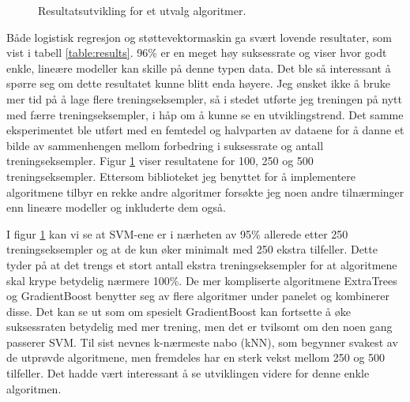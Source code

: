 \begin{figure}[h!]
\centering
{}
\label{figure:resultsgraf}
\caption{Resultatsutvikling for et utvalg algoritmer.}
\end{figure}

Både logistisk regresjon og støttevektormaskin ga svært lovende resultater, som vist i tabell \ref{table:results}. 96\% er en meget høy suksessrate og viser hvor godt enkle, lineære modeller kan skille på denne typen data. Det ble så interessant å spørre seg om dette resultatet kunne blitt enda høyere. Jeg ønsket ikke å bruke mer tid på å lage flere treningseksempler, så i stedet utførte jeg treningen på nytt med færre treningseksempler, i håp om å kunne se en utviklingstrend. Det samme eksperimentet ble utført med en femtedel og halvparten av dataene for å danne et bilde av sammenhengen mellom forbedring i suksessrate og antall treningseksempler. Figur \ref{figure:resultsgraf} viser resultatene for 100, 250 og 500 treningseksempler. Ettersom biblioteket jeg benyttet for å implementere algoritmene tilbyr en rekke andre algoritmer forsøkte jeg noen andre tilnærminger enn lineære modeller og inkluderte dem også.

I figur \ref{figure:resultsgraf} kan vi se at SVM-ene er i nærheten av 95\% allerede etter 250 treningseksempler og at de kun øker minimalt med 250 ekstra tilfeller. Dette tyder på at det trengs et stort antall ekstra treningseksempler for at algoritmene skal krype betydelig nærmere 100\%. De mer kompliserte algoritmene ExtraTrees og GradientBoost benytter seg av flere algoritmer under panelet og kombinerer disse. Det kan se ut som om spesielt GradientBoost kan fortsette å øke suksessraten betydelig med mer trening, men det er tvilsomt om den noen gang passerer SVM. Til sist nevnes k-nærmeste nabo (kNN), som begynner svakest av de utprøvde algoritmene, men fremdeles har en sterk vekst mellom 250 og 500 tilfeller. Det hadde vært interessant å se utviklingen videre for denne enkle algoritmen.

